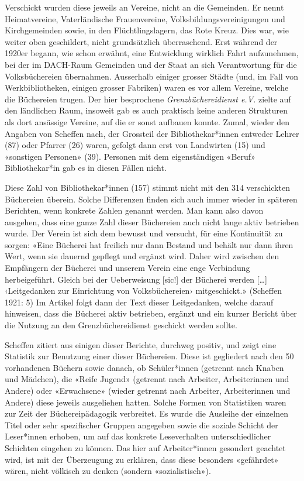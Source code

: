 \documentclass[a4paper,
fontsize=11pt,
oneside,
numbers=noperiodatend,
parskip=half-,
bibliography=totoc,
final
]{scrartcl}
\begin{document}
Verschickt wurden diese jeweils an Vereine, nicht an die Gemeinden. Er
nennt Heimatvereine, Vaterländische Frauenvereine,
Volksbildungsvereinigungen und Kirchgemeinden sowie, in den
Flüchtlingslagern, das Rote Kreuz. Dies war, wie weiter oben
geschildert, nicht grundsätzlich überraschend. Erst während der 1920er
begann, wie schon erwähnt, eine Entwicklung wirklich Fahrt aufzunehmen,
bei der im DACH-Raum Gemeinden und der Staat an sich Verantwortung für
die Volksbüchereien übernahmen. Ausserhalb einiger grosser Städte (und,
im Fall von Werkbibliotheken, einigen grosser Fabriken) waren es vor
allem Vereine, welche die Büchereien trugen. Der hier besprochene
\emph{Grenzbüchereidienst e.V.} zielte auf den ländlichen Raum, insoweit
gab es auch praktisch keine anderen Strukturen als dort ansässige
Vereine, auf die er sonst aufbauen konnte. Zumal, wieder den Angaben von
Scheffen nach, der Grossteil der Bibliothekar*innen entweder Lehrer (87)
oder Pfarrer (26) waren, gefolgt dann erst von Landwirten (15) und
«sonstigen Personen» (39). Personen mit dem eigenständigen «Beruf»
Bibliothekar*in gab es in diesen Fällen nicht.

Diese Zahl von Bibliothekar*innen (157) stimmt nicht mit den 314
verschickten Büchereien überein. Solche Differenzen finden sich auch
immer wieder in späteren Berichten, wenn konkrete Zahlen genannt werden.
Man kann also davon ausgehen, dass eine ganze Zahl dieser Büchereien
auch nicht lange aktiv betrieben wurde. Der Verein ist sich dem bewusst
und versucht, für eine Kontinuität zu sorgen: «Eine Bücherei hat
freilich nur dann Bestand und behält nur dann ihren Wert, wenn sie
dauernd gepflegt und ergänzt wird. Daher wird zwischen den Empfängern
der Bücherei und unserem Verein eine enge Verbindung herbeigeführt.
Gleich bei der Ueberweisung {[}sic!{]} der Bücherei werden {[}\ldots{]}
‹Leitgedanken zur Einrichtung von Volksbüchereien› mitgeschickt.»
(Scheffen 1921: 5) Im Artikel folgt dann der Text dieser Leitgedanken,
welche darauf hinweisen, dass die Bücherei aktiv betrieben, ergänzt und
ein kurzer Bericht über die Nutzung an den Grenzbüchereidienst geschickt
werden sollte.

Scheffen zitiert aus einigen dieser Berichte, durchweg positiv, und
zeigt eine Statistik zur Benutzung einer dieser Büchereien. Diese ist
gegliedert nach den 50 vorhandenen Büchern sowie danach, ob
Schüler*innen (getrennt nach Knaben und Mädchen), die «Reife Jugend»
(getrennt nach Arbeiter, Arbeiterinnen und Andere) oder «Erwachsene»
(wieder getrennt nach Arbeiter, Arbeiterinnen und Andere) diese jeweils
ausgeliehen hatten. Solche Formen von Statistiken waren zur Zeit der
Büchereipädagogik verbreitet. Es wurde die Ausleihe der einzelnen Titel
oder sehr spezifischer Gruppen angegeben sowie die soziale Schicht der
Leser*innen erhoben, um auf das konkrete Leseverhalten unterschiedlicher
Schichten eingehen zu können. Das hier auf Arbeiter*innen gesondert
geachtet wird, ist mit der Überzeugung zu erklären, dass diese besonders
«gefährdet» wären, nicht völkisch zu denken (sondern «sozialistisch»).
\end{document}
